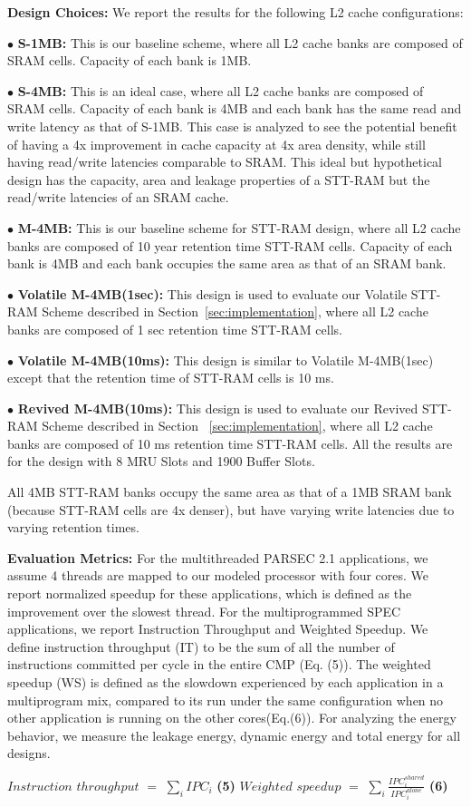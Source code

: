 \noindent\textbf{Design Choices:}
We report the results for the following L2 cache configurations:


$\bullet$ {\bf S-1MB:} This is our baseline scheme, where all L2 cache banks are
composed of SRAM cells. Capacity of each bank is 1MB.

$\bullet$ {\bf S-4MB:} This is an ideal case, where all L2 cache banks
are composed of SRAM cells. Capacity of each bank is 4MB and each bank
has the same read and write latency as that of S-1MB. This case is analyzed to see the potential benefit
of having a 4x improvement in cache capacity at 4x area density, while still having read/write latencies comparable to SRAM.
This ideal but hypothetical design has the capacity, area and leakage properties of a STT-RAM but the read/write latencies of an SRAM cache.

$\bullet$ {\bf M-4MB:} This is our baseline scheme for STT-RAM design, where
all L2 cache banks are composed of 10 year retention time STT-RAM cells.
Capacity of each bank is 4MB and each bank occupies the same area as that of an SRAM bank.

$\bullet$ {\bf Volatile M-4MB(1sec):} This design is used to evaluate our
 Volatile STT-RAM Scheme described in Section~\ref{sec:implementation}, where all L2 cache
banks are composed of 1 sec retention time STT-RAM cells.

$\bullet$ {\bf Volatile M-4MB(10ms):} This design is similar to Volatile M-4MB(1sec)
except that the retention time of STT-RAM cells is 10 ms.

$\bullet$ {\bf Revived M-4MB(10ms):} This design is used to evaluate our
 Revived STT-RAM Scheme described in Section ~\ref{sec:implementation}, where all L2 cache
banks are composed of 10 ms retention time STT-RAM cells. All the
results are for the design with 8 MRU Slots and 1900 Buffer Slots.

All 4MB STT-RAM banks occupy the same area as that of a 1MB SRAM bank (because STT-RAM cells are 4x denser), but have varying write latencies due to varying retention times.

\noindent\textbf{ Evaluation Metrics:}
For the multithreaded PARSEC 2.1 applications, we assume 4 threads are mapped to our modeled
processor with four cores. We report normalized speedup for these applications,
which is defined as the improvement over the slowest thread.
For the multiprogrammed SPEC applications, we report Instruction Throughput and Weighted Speedup.
We define instruction throughput (IT) to be the sum of all the number of instructions committed
per cycle in the entire CMP (Eq. (5)).  The weighted speedup (WS) is defined as the slowdown experienced
by each application in a multiprogram mix, compared to its run under the same
configuration when no other application is running on the other cores(Eq.(6)). For analyzing the energy behavior, we measure the leakage energy, dynamic energy and total energy for all designs.

{
 $Instruction$ $throughput$ $=$ $\displaystyle\sum_{i} IPC_{i}$ \hspace{1mm} \textbf{(5)} \hspace{4mm}
 $Weighted$ $speedup$ $=$ $\displaystyle\sum_{i}
\frac{IPC_{i}^{shared}}{IPC_{i}^{alone}}$ \hspace{1mm} \textbf{(6)}
}




